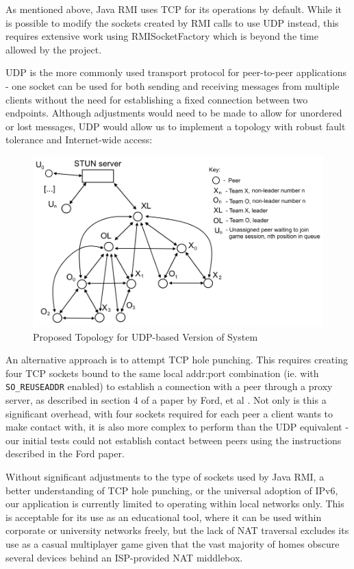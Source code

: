 \documentclass[conference]{IEEEtran}
\begin{document}
As mentioned above, Java RMI uses TCP for its operations by default. While it is possible to modify the sockets created by RMI calls to use UDP instead, this requires extensive work using RMISocketFactory which is beyond the time allowed by the project.

UDP is the more commonly used transport protocol for peer-to-peer applications - one socket can be used for both sending and receiving messages from multiple clients without the need for establishing a fixed connection between two endpoints. Although adjustments would need to be made to allow for unordered or lost messages, UDP would allow us to implement a topology with robust fault tolerance and Internet-wide access:

\begin{figure}[h]
	\includegraphics[width=\linewidth]{images/p2p-topology-3point.png}
	\caption{Proposed Topology for UDP-based Version of System}
	\label{fig:topology-udp}
\end{figure}

An alternative approach is to attempt TCP hole punching. This requires creating four TCP sockets bound to the same local addr:port combination (ie. with \texttt{SO\_REUSEADDR} enabled) to establish a connection with a peer through a proxy server, as described in section 4 of a paper by Ford, et al \cite{ford_srisuresh_kegel_2005}. Not only is this a significant overhead, with four sockets required for each peer a client wants to make contact with, it is also more complex to perform than the UDP equivalent - our initial tests could not establish contact between peers using the instructions described in the Ford paper.

Without significant adjustments to the type of sockets used by Java RMI, a better understanding of TCP hole punching, or the universal adoption of IPv6, our application is currently limited to operating within local networks only. This is acceptable for its use as an educational tool, where it can be used within corporate or university networks freely, but the lack of NAT traversal excludes its use as a casual multiplayer game given that the vast majority of homes obscure several devices behind an ISP-provided NAT middlebox.
\end{document}
